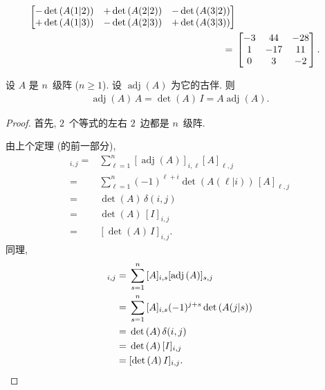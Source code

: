 \documentclass[../libro.tex]{subfiles}
\begin{document}
\begin{example}
\begin{align*}
\begin{bmatrix}
            -\det {(A(1|2))}
            & +\det {(A(2|2))}
            & -\det {(A(3|2))} \\
            +\det {(A(1|3))}
            & -\det {(A(2|3))}
            & +\det {(A(3|3))} \\
        \end{bmatrix}
        \\
        = {} &
        \begin{bmatrix}
            -3 & 44  & -28 \\
            1  & -17 & 11  \\
            0  & 3   & -2  \\
        \end{bmatrix}.
        \qedhere
    \end{align*}
\end{example}

\begin{theorem}
    设 \(A\) 是 \(n\)~级阵 (\(n \geq 1\)).
    设 \(\operatorname{adj} {(A)}\) 为它的古伴.
    则
    \begin{align*}
        \operatorname{adj} {(A)}\, A
        = \det {(A)}\, I
        = A \operatorname{adj} {(A)}.
    \end{align*}
\end{theorem}

\begin{proof}
    首先, \(2\)~个等式的左右 \(2\)~边都是 \(n\)~级阵.

    由上个定理 (的前一部分),
    \begin{align*}
        [\operatorname{adj} {(A)}\, A]_{i,j}
        = {} &
        \sum_{\ell = 1}^{n}
        {[\operatorname{adj} {(A)}]_{i,\ell} [A]_{\ell,j}}
        \\
        = {} &
        \sum_{\ell = 1}^{n}
        {(-1)^{\ell+i} \det {(A(\ell|i))}\, [A]_{\ell,j}}
        \\
        = {} & \det {(A)}\, \delta(i, j)
        \\
        = {} & \det {(A)}\, [I]_{i,j}
        \\
        = {} & [\det {(A)}\, I]_{i,j}.
    \end{align*}
    同理,
    \begin{align*}
        [A \operatorname{adj} {(A)}]_{i,j}
        = {} &
        \sum_{s = 1}^{n}
        {[A]_{i,s} [\operatorname{adj} {(A)}]_{s,j}}
        \\
        = {} &
        \sum_{s = 1}^{n}
        {[A]_{i,s} (-1)^{j+s} \det {(A(j|s))}}
        \\
        = {} & \det {(A)}\, \delta(i, j)
        \\
        = {} & \det {(A)}\, [I]_{i,j}
        \\
        = {} & [\det {(A)}\, I]_{i,j}.
        \qedhere
    \end{align*}
\end{proof}
\end{document}
